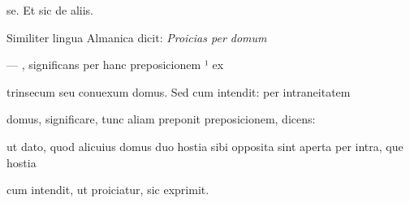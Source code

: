 se. Et sic de aliis.

\indentK Similiter lingua Almanica dicit: \textit{Proicias per domum}

\fulllines{}

— , significans per hanc preposicionem ¹ ex

trinsecum seu conuexum domus. Sed cum intendit: per intraneitatem

domus, significare, tunc aliam preponit preposicionem, dicens: 




\fullpreviouslines
{
\color{blue}


ut dato, quod alicuius domus duo hostia sibi opposita sint aperta per intra, que hostia%

cum intendit, ut proiciatur, sic exprimit.

}



